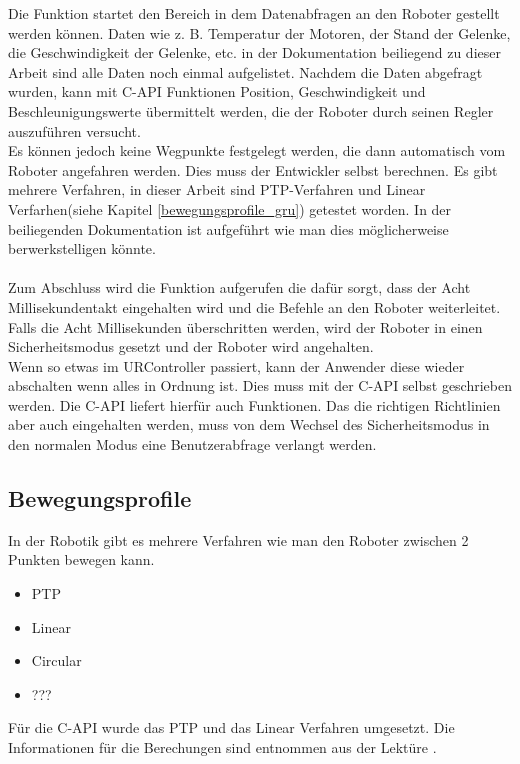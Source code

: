 Die Funktion  startet den Bereich in dem Datenabfragen an den Roboter gestellt werden können. Daten wie z. B. Temperatur der Motoren, der Stand der Gelenke, die Geschwindigkeit der Gelenke, etc. in der Dokumentation beiliegend zu dieser Arbeit sind alle Daten noch einmal aufgelistet. Nachdem die Daten abgefragt wurden, kann mit C-\acs{API} Funktionen Position, Geschwindigkeit und Beschleunigungswerte übermittelt werden, die der Roboter durch seinen Regler auszuführen versucht.\\
Es können jedoch keine Wegpunkte festgelegt werden, die dann automatisch vom Roboter angefahren werden. Dies muss der Entwickler selbst 
berechnen. 
Es gibt mehrere Verfahren, in dieser Arbeit sind \ac{PTP}-Verfahren und Linear Verfarhen(siehe Kapitel \ref{bewegungsprofile_gru}) getestet worden. In der beiliegenden Dokumentation ist aufgeführt wie man dies möglicherweise berwerkstelligen könnte.
\\\\
Zum Abschluss wird die Funktion  aufgerufen die dafür sorgt, dass der Acht Millisekundentakt eingehalten wird und die Befehle an den Roboter weiterleitet. Falls die Acht Millisekunden überschritten werden, wird der Roboter in einen Sicherheitsmodus gesetzt und der Roboter wird angehalten.
\\
Wenn so etwas im URController passiert, kann der Anwender diese wieder abschalten wenn alles in Ordnung ist. Dies muss mit der C-\acs{API} selbst geschrieben werden. Die C-\acs{API} liefert hierfür auch Funktionen. Das die richtigen Richtlinien aber auch eingehalten werden, muss von dem Wechsel des Sicherheitsmodus in den normalen Modus eine Benutzerabfrage verlangt werden.

\subsection{Bewegungsprofile}
\label{sub:bewegungsprofile_gru}

In der Robotik gibt es mehrere Verfahren wie man den Roboter zwischen 2 Punkten bewegen kann. 

\begin{itemize}
\item \acf{PTP}
\item Linear
\item Circular
\item ???
\end{itemize}

Für die C-\ac{API} wurde das \ac{PTP} und das Linear Verfahren umgesetzt. Die Informationen für die Berechungen sind entnommen aus der Lektüre \cite{WW-2013}.

